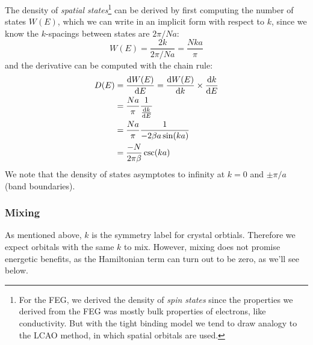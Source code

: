 The density of \emph{spatial states}\footnote{For the FEG, we derived the density of \emph{spin states} since the properties we derived from the FEG was mostly bulk properties of electrons, like conductivity. But with the tight binding model we tend to draw analogy to the LCAO method, in which spatial orbitals are used.} can be derived by first computing the number of states $W(E)$, which we can write in an implicit form with respect to $k$, since we know the $k$-spacings between states are $2\pi/Na$:
\begin{equation}
	W(E)=\frac{2k}{2\pi/Na}=\frac{Nka}{\pi}
\end{equation}
and the derivative can be computed with the chain rule:
\begin{equation}
\begin{aligned}
D(E)&=\diff{W(E)}{E}=\diff{W(E)}{k}\times\diff{k}{E}\\
&=\frac{Na}{\pi}\frac{1}{\diff{k}{E}}\\
&=\frac{Na}{\pi}\frac{1}{-2\beta a\sin(ka)}\\
&=\frac{-N}{2\pi\beta}\csc(ka)
\end{aligned}
\end{equation}
We note that the density of states asymptotes to infinity at $k=0$ and $\pm\pi/a$ (band boundaries).
\subsubsection{Mixing}
As mentioned above, $k$ is the symmetry label for crystal orbtials. Therefore we expect orbitals with the same $k$ to mix. However, mixing does not promise energetic benefits, as the Hamiltonian term can turn out to be zero, as we'll see below.
